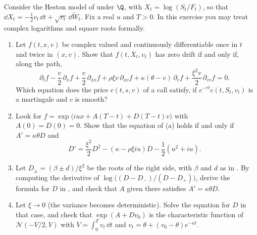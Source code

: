 \begin{exercise}\label{ex:iv-heston-riccati}
\hard Consider the Heston model of  under $\Q$, with $X_t=\log(S_t/F_t)$, so that
$\dd X_t=-\frac12v_t\,\dd t+\sqrt{v_t}\,\dd\widetilde W_t$. Fix a real $u$ and $T>0$. In this exercise you may
treat complex logarithms and square roots formally.
\begin{enumerate}[label=(\alph*)]
  \item Let $f(t,x,v)$ be complex valued and continuously differentiable once in $t$ and twice in
    $(x,v)$. Show that $f(t,X_t,v_t)$ has zero drift if and only if, along the path,
    \[
      \partial_tf-\frac v2\,\partial_xf+\frac v2\,\partial_{xx}f+\rho\xi v\,\partial_{xv}f+\kappa(\theta-v)\,\partial_vf
      +\frac{\xi^2v}2\,\partial_{vv}f=0 .
    \]
    Which equation does the price $c(t,s,v)$ of a call satisfy, if $e^{-rt}c(t,S_t,v_t)$ is a martingale
    and $c$ is smooth?
  \item Look for $f=\exp\big(iux+A(T-t)+D(T-t)v\big)$ with $A(0)=D(0)=0$. Show that the equation of (a) holds
    if and only if $A'=\kappa\theta D$ and
    \[
      D'=\frac{\xi^2}2D^2-(\kappa-\rho\xi iu)D-\frac12(u^2+iu).
    \]
  \item Let $D_\pm=(\beta\pm d)/\xi^2$ be the roots of the right side, with $\beta$ and $d$ as in
    . By computing the derivative of $\log\big((D-D_-)/(D-D_+)\big)$, derive the
    formula for $D$ in , and check that $A$ given there satisfies $A'=\kappa\theta D$.
  \item Let $\xi\to0$ (the variance becomes deterministic). Solve the equation for $D$ in that case, and
    check that $\exp(A+Dv_0)$ is the characteristic function of $\mathcal N(-V/2,V)$ with
    $V=\int_0^Tv_t\,\dd t$ and $v_t=\theta+(v_0-\theta)e^{-\kappa t}$.
\end{enumerate}
\end{exercise}

